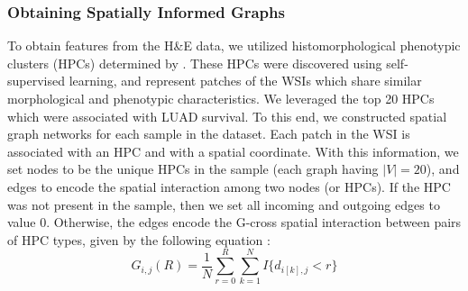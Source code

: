 \documentclass[pdflatex,article,12pt]{article}
\begin{document}
\subsubsection{Obtaining Spatially Informed Graphs}
To obtain features from the H\&E data, we utilized histomorphological phenotypic clusters (HPCs) determined by \cite{claudio2024mapping}. These HPCs were discovered using self-supervised learning, and represent patches of the WSIs which share similar morphological and phenotypic characteristics. We leveraged the top 20 HPCs which were associated with LUAD survival. To this end, we constructed spatial graph networks for each sample in the dataset. Each patch in the WSI is associated with an HPC and with a spatial coordinate. With this information, we set nodes to be the unique HPCs in the sample (each graph having $|V|=20$), and edges to encode the spatial interaction among two nodes (or HPCs). If the HPC was not present in the sample, then we set all incoming and outgoing edges to value 0. Otherwise, the edges encode the G-cross spatial interaction between pairs of HPC types, given by the following equation \cite{spatstat_book}:
\begin{equation}
    G_{i,j} (R) =  \frac{1}{N} \sum_{r=0}^{R} \sum_{k=1}^{N} I\{d_{i[k],j} < r\}
\end{equation}
\end{document}
